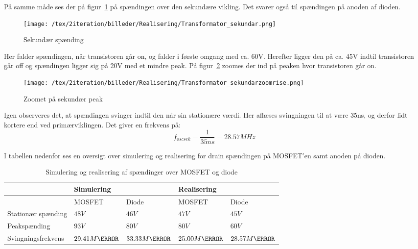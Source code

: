 På samme måde ses der på figur~\ref{fig:sek} på spændingen over den sekundære vikling. Det svarer også til spændingen på anoden af dioden. 
\begin{figure}[H]
	\center
	\texttt{[image: /tex/2iteration/billeder/Realisering/Transformator\_sekundar.png]}
	\caption{Sekundær spænding}
	\label{fig:sek}
\end{figure}
Her falder spændingen, når transistoren går on, og falder i første omgang med ca. 60V. Herefter ligger den på ca. 45V indtil transistoren går off og spændingen ligger sig på 20V med et mindre peak. På figur~\ref{fig:sekzoom} zoomes der ind på peaken hvor transistoren går on.
\begin{figure}[H]
	\center
	\texttt{[image: /tex/2iteration/billeder/Realisering/Transformator\_sekundarzoomrise.png]}
	\caption{Zoomet på sekundær peak}
	\label{fig:sekzoom}
\end{figure}
Igen observeres det, at spændingen svinger indtil den når sin stationære værdi. Her aflæses svingningen til at være 35ns, og derfor lidt kortere end ved primærviklingen. Det giver en frekvens på:
\begin{equation} \label{svingsek}
f_{oscsek} = \frac{1}{35ns} = 28.57MHz
\end{equation}

I tabellen nedenfor ses en oversigt over simulering og realisering for drain spændingen på MOSFET'en samt anoden på dioden.

\begin{table}[H] 			
	\centering
	\begin{tabularx}{\textwidth}{|X|l|l|l|l|}
		\hline
		 & \multicolumn{2}{|X|}{\textbf{Simulering}} & \multicolumn{2}{|X|}{\textbf{Realisering}} \\ \hline
		 & MOSFET & Diode & MOSFET & Diode \\ \hline
		Stationær spænding & $48V$ & $46V$ & $47V$ & $45V$ \\ \hline
		Peakspænding & $93V$ & $80V$ & $80V$ & $60V$ \\ \hline
		Svingningsfrekvens & $29.41M\hertz$ & $33.33M\hertz$ & $25.00M\hertz$ & $28.57M\hertz$ \\ \hline
	\end{tabularx}
	\caption{Simulering og realisering af spændinger over MOSFET og diode}
	\label{tab:MOSDIODE}
\end{table}


